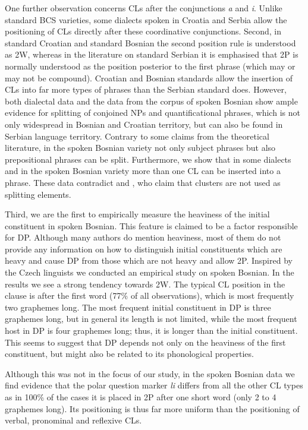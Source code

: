 One further observation concerns CLs after the conjunctions \textit{a} and \textit{i}. Unlike standard BCS varieties, some dialects spoken in Croatia and Serbia allow the positioning of CLs directly after these coordinative conjunctions. Second, in standard Croatian and standard Bosnian the second position rule is understood as 2W, whereas in the literature on standard Serbian it is emphasised that 2P is normally understood as the position posterior to the first phrase (which may or may not be compound). Croatian and Bosnian standards allow the insertion of CLs into far more types of phrases than the Serbian standard does. However, both dialectal data and the data from the corpus of spoken Bosnian show ample evidence for splitting of conjoined NPs and quantificational phrases, which is not only widespread in Bosnian and Croatian territory, but can also be found in Serbian language territory. Contrary to some claims from the theoretical literature, in the spoken Bosnian variety not only subject phrases but also prepositional phrases can be split. Furthermore, we show that in some dialects and in the spoken Bosnian variety more than one CL can be inserted into a phrase. These data contradict \citet{Progovac96} and \citet{RadanovicKocic88, RadanovicKocic96}, who claim that clusters are not used as splitting elements. 

Third, we are the first to empirically measure the heaviness of the initial constituent in spoken Bosnian. This feature is claimed to be a factor responsible for DP. Although many authors do mention heaviness, most of them do not provide any information on how to distinguish initial constituents which are heavy and cause DP from those which are not heavy and allow 2P. Inspired by the Czech linguists \citet{KCN18} we conducted an empirical study on spoken Bosnian. In the results we see a strong tendency towards 2W. The typical CL position in the clause is after the first word (77\% of all observations), which is most frequently two graphemes long. The most frequent initial constituent in DP is three graphemes long, but in general its length is not limited, while the most frequent host in DP is four graphemes long; thus, it is longer than the initial constituent. This seems to suggest that DP depends not only on the heaviness of the first constituent, but might also be related to its phonological properties. 


Although this was not in the focus of our study, in the spoken Bosnian data we find evidence that the polar question marker \textit{li }differs from all the other CL types as in 100\% of the cases it is placed in 2P after one short word (only 2 to 4 graphemes long). Its positioning is thus far more uniform than the positioning of verbal, pronominal and reflexive CLs. 



